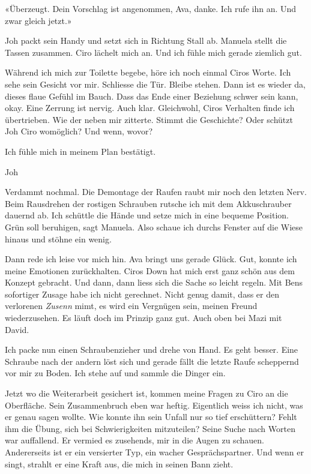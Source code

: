 «Überzeugt. Dein Vorschlag ist angenommen, Ava, danke. Ich rufe ihn an.
Und zwar gleich jetzt.»

Joh packt sein Handy und setzt sich in Richtung Stall ab. Manuela stellt
die Tassen zusammen. Ciro lächelt mich an. Und ich fühle mich gerade
ziemlich gut.

Während ich mich zur Toilette begebe, höre ich noch einmal Ciros Worte.
Ich sehe sein Gesicht vor mir. Schliesse die Tür. Bleibe stehen. Dann
ist es wieder da, dieses flaue Gefühl im Bauch. Dass das Ende einer
Beziehung schwer sein kann, okay. Eine Zerrung ist nervig. Auch klar.
Gleichwohl, Ciros Verhalten finde ich übertrieben. Wie der neben mir
zitterte. Stimmt die Geschichte? Oder schützt Joh Ciro womöglich? Und
wenn, wovor?

Ich fühle mich in meinem Plan bestätigt.

Joh

Verdammt nochmal. Die Demontage der Raufen raubt mir noch den letzten
Nerv. Beim Rausdrehen der rostigen Schrauben rutsche ich mit dem
Akkuschrauber dauernd ab. Ich schüttle die Hände und setze mich in eine
bequeme Position. Grün soll beruhigen, sagt Manuela. Also schaue ich
durchs Fenster auf die Wiese hinaus und stöhne ein wenig.

Dann rede ich leise vor mich hin. Ava bringt uns gerade Glück. Gut,
konnte ich meine Emotionen zurückhalten. Ciros Down hat mich erst ganz
schön aus dem Konzept gebracht. Und dann, dann liess sich die Sache so
leicht regeln. Mit Bens sofortiger Zusage habe ich nicht gerechnet.
Nicht genug damit, dass er den verlorenen \emph{Zusenn} mimt, es wird
ein Vergnügen sein, meinen Freund wiederzusehen. Es läuft doch im
Prinzip ganz gut. Auch oben bei Mazi mit David.

Ich packe nun einen Schraubenzieher und drehe von Hand. Es geht besser.
Eine Schraube nach der andern löst sich und gerade fällt die letzte
Raufe scheppernd vor mir zu Boden. Ich stehe auf und sammle die Dinger
ein.

Jetzt wo die Weiterarbeit gesichert ist, kommen meine Fragen zu Ciro an
die Oberfläche. Sein Zusammenbruch eben war heftig. Eigentlich weiss ich
nicht, was er genau sagen wollte. Wie konnte ihn sein Unfall nur so tief
erschüttern? Fehlt ihm die Übung, sich bei Schwierigkeiten mitzuteilen?
Seine Suche nach Worten war auffallend. Er vermied es zusehends, mir in
die Augen zu schauen. Andererseits ist er ein versierter Typ, ein wacher
Gesprächspartner. Und wenn er singt, strahlt er eine Kraft aus, die mich
in seinen Bann zieht.

